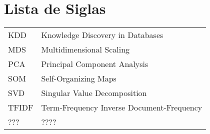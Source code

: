 \chapter*{Lista de Siglas}

\begin{tabular}{l l}
    KDD  & Knowledge Discovery in Databases\\
    MDS  & Multidimensional Scaling\\
    PCA  & Principal Component Analysis\\
    SOM  & Self-Organizing Maps\\
    SVD  & Singular Value Decomposition\\
    TFIDF & Term-Frequency Inverse Document-Frequency\\
    ???  & ????\\
\end{tabular}

